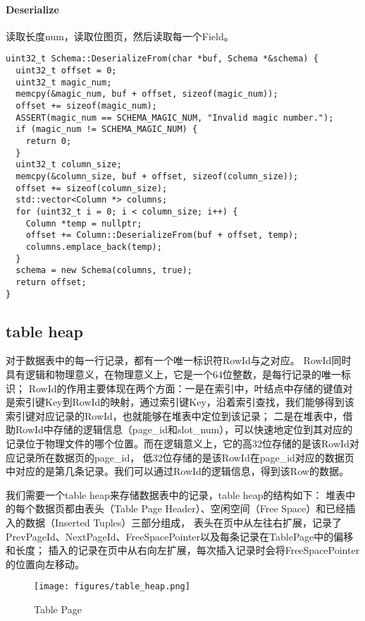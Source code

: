 \documentclass[12pt,hyperref,a4paper,UTF8]{ctexart}
\begin{document}
\paragraph{Deserialize}

读取长度num，读取位图页，然后读取每一个Field。

\begin{verbatim}
uint32_t Schema::DeserializeFrom(char *buf, Schema *&schema) {
  uint32_t offset = 0;
  uint32_t magic_num;
  memcpy(&magic_num, buf + offset, sizeof(magic_num));
  offset += sizeof(magic_num);
  ASSERT(magic_num == SCHEMA_MAGIC_NUM, "Invalid magic number.");
  if (magic_num != SCHEMA_MAGIC_NUM) {
    return 0;
  }
  uint32_t column_size;
  memcpy(&column_size, buf + offset, sizeof(column_size));
  offset += sizeof(column_size);
  std::vector<Column *> columns;
  for (uint32_t i = 0; i < column_size; i++) {
    Column *temp = nullptr;
    offset += Column::DeserializeFrom(buf + offset, temp);
    columns.emplace_back(temp);
  }
  schema = new Schema(columns, true);
  return offset;
}
\end{verbatim}

\subsection{table heap}

对于数据表中的每一行记录，都有一个唯一标识符RowId与之对应。
RowId同时具有逻辑和物理意义，在物理意义上，它是一个64位整数，是每行记录的唯一标识；
RowId的作用主要体现在两个方面：一是在索引中，叶结点中存储的键值对是索引键Key到RowId的映射，通过索引键Key，沿着索引查找，我们能够得到该索引键对应记录的RowId，也就能够在堆表中定位到该记录；
二是在堆表中，借助RowId中存储的逻辑信息（page\_id和slot\_num），可以快速地定位到其对应的记录位于物理文件的哪个位置。而在逻辑意义上，它的高32位存储的是该RowId对应记录所在数据页的page\_id，
低32位存储的是该RowId在page\_id对应的数据页中对应的是第几条记录。我们可以通过RowId的逻辑信息，得到该Row的数据。

我们需要一个table heap来存储数据表中的记录，table heap的结构如下：
堆表中的每个数据页都由表头（Table Page Header）、空闲空间（Free Space）和已经插入的数据（Inserted Tuples）三部分组成，
表头在页中从左往右扩展，记录了PrevPageId、NextPageId、FreeSpacePointer以及每条记录在TablePage中的偏移和长度；
插入的记录在页中从右向左扩展，每次插入记录时会将FreeSpacePointer的位置向左移动。

\begin{figure}[!htbp]
    \centering
    \texttt{[image: figures/table\_heap.png]}
    \caption{Table Page}
    \label{table_page}
\end{figure}
\end{document}
